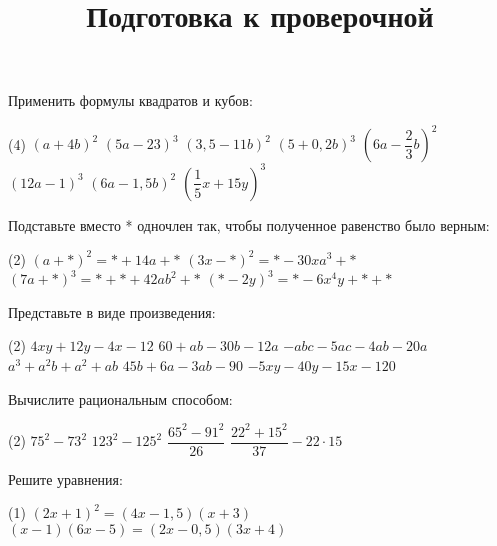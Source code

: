 \begin{class}[number=7]
	\title{Подготовка к проверочной}
	\begin{listofex}
		\item Применить формулы квадратов и кубов:
		\begin{tasks}(4)
			\task \( (a+4b)^2 \)
			\task \( (5a-23)^3 \)
			\task \( (3,5-11b)^2 \)
			\task \( (5+0,2b)^3 \)
			\task \( (6a-\dfrac{2}{3}b)^2 \)
			\task \( (12a-1)^3 \)
			\task \( (6a-1,5b)^2 \)
			\task \( \left( \dfrac{1}{5}x + 15y \right)^3 \)
		\end{tasks}
		\item Подставьте вместо * одночлен так, чтобы полученное равенство было верным:
		\begin{tasks}(2)
			\task \( (a+*)^2=*+14a+* \)
			\task \( (3x-*)^2=*-30xa^3+* \)
			\task \( (7a+*)^3=*+*+42ab^2+*  \)
			\task \( (*-2y)^3=*-6x^4y+*+* \)
		\end{tasks}
		\item Представьте в виде произведения:
		\begin{tasks}(2)
			\task \( 4xy+12y-4x-12 \)
			\task \( 60+ab-30b-12a \)
			\task \( -abc-5ac-4ab-20a \)
			\task \( a^3+a^2b+a^2+ab \)
			\task \( 45b+6a-3ab-90 \)
			\task \( -5xy-40y-15x-120 \)
		\end{tasks}
		\item Вычислите рациональным способом:
		\begin{tasks}(2)
			\task \( 75^2-73^2 \)
			\task \( 123^2-125^2 \)
			\task \( \dfrac{65^2-91^2}{26} \)
			\task \( \dfrac{22^2+15^2}{37} - 22 \cdot 15 \)
		\end{tasks}
		\item Решите уравнения:
		\begin{tasks}(1)
			\task \( (2x+1)^2= (4x-1,5)(x+3) \)
			\task \( (x-1)(6x-5)=(2x-0,5)(3x+4) \)
		\end{tasks}
		
	\end{listofex}
\end{class}

